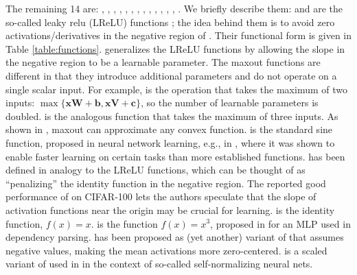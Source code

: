 The remaining 14 are: \mytanh, \mysin, \relu, \lrelua, \lrelub, \maxouta, \maxoutb, \maxoutc, \prelu, \linear, \elu{}, \cube, \pentan, \selu{}. We briefly describe 
them: 
\lrelua{} and \lrelub{} are the so-called leaky relu (LReLU) functions \cite{Maas:2013}; the idea behind them is to avoid zero activations/derivatives in the negative region of \relu{}. Their functional form is given in Table \ref{table:functions}. \prelu{} \cite{He:2015} generalizes the LReLU functions by allowing the slope in the negative region to be a %
learnable parameter. The maxout functions \cite{Goodfellow:2013} are different in that they introduce additional parameters and do not operate on a single scalar input. For example, \maxouta{} is the operation that takes the maximum of two inputs: $\max\{\mathbf{xW}+\mathbf{b},\mathbf{xV}+\mathbf{c}\}$, so the number of learnable parameters is doubled. \maxoutb{} is the analogous function that takes the maximum of three inputs.
As shown in \citet{Goodfellow:2013}, maxout can approximate any convex function. \mysin{} is the standard sine function, proposed in neural network learning, e.g., in \citet{Parascandolo:2016}, where it was shown to enable faster learning on certain tasks than more established functions. \pentan{} \cite{Xu:2016} has been defined in analogy to the LReLU functions, which can be thought of as ``penalizing'' the identity function in the negative region. 
The reported good performance of \pentan{} on CIFAR-100 \cite{Krizhevsky:2009}
lets the authors speculate that the slope %
of activation functions near the origin may be crucial for learning. 
\linear{} is the identity function, $f(x)=x$. \cube{} is the function $f(x)=x^3$, proposed in \citet{Chen:2014} for an MLP used in dependency parsing. \elu{} \cite{Clevert:2015} has been proposed as (yet another) variant of \relu{} that assumes negative values, making the mean activations more zero-centered. \selu{} is a scaled variant of \elu{} used in \citet{Klambauer:2017} in the context of so-called self-normalizing neural nets.

